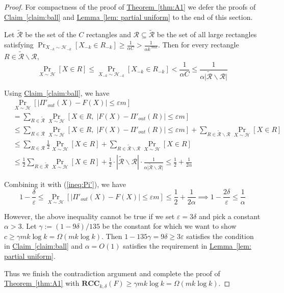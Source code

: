 \documentclass[11pt]{article}
\numberwithin{equation}{section}
\theoremstyle{definition}
\theoremstyle{plain}
\newcommand{\expref}[2]{\hyperref[#2]{#1~\ref{#2}}}
\newcommand{\follows}{\ensuremath{\sim}}
\newcommand{\error}{\ensuremath{\delta}}
\newcommand{\gap}{\ensuremath{\varepsilon}}
\newcommand{\bigo}[1]{\ensuremath{{{O} \left( {#1} \right)}}}
\newcommand{\bigomega}[1]{\ensuremath{{\Omega \left( {#1} \right)}}}
\newcommand{\eqdef}{\ensuremath{:=}}
\newcommand{\rcc}{\ensuremath{\mathbf{RCC}}}
\begin{document}
\begin{proof}
		For compactness of the proof of \expref{Theorem}{thm:A1} we defer the proofs of \expref{Claim}{claim:ball} and \expref{Lemma}{lem: partial uniform}  to the end of this section.

		Let $\widetilde{\mathcal{R}}$ be the set of the $C$ rectangles and $\mathcal{R}\subseteq\widetilde{\mathcal{R}}$ be the set of all large rectangles satisfying $\Pr_{X_{-k} \sim \mathcal{H}_{-k}}[X_{-k}\in R_{-k}]\ge \frac{1}{\alpha C}>\frac{1}{\alpha k^{\gamma mk}}$.
		Then for every rectangle $R\in \widetilde{\mathcal{R}}\backslash\mathcal{R}$, 
		\[\Pr_{X \sim \mathcal{H}}[X\in R]\le  \Pr_{X_{-k} \sim \mathcal{H}_{-k}}[X_{-k}\in R_{-k}]< \frac{1}{\alpha C} \le \frac{1}{\alpha \big|\widetilde{\mathcal{R}}\backslash\mathcal{R}
		\big|} \]

		Using \expref{Claim}{claim:ball}, we have
		\begin{align*}
			&\Pr_{X\follows \mathcal{H}}\left[ \left| \Pi'_{out}(X) - F(X)\right| \le \gap m \right]	\\
			&=  \sum_{R\in \widetilde{\mathcal{R}}} %
			\Pr_{X\follows \mathcal{H}}\left[  X\in R,\; \left|F(X)-\Pi'_{out}(R)\right|\le \gap m \right] \\
			&\le  \sum_{R\in {\mathcal{R}}} %
			\Pr_{X\follows \mathcal{H}}\left[  X\in R,\; \left|F(X)-\Pi'_{out}(R)\right|\le \gap m \right] 
			+ \sum_{R\in \widetilde{\mathcal{R}}\backslash\mathcal{R}} \Pr_{X\follows \mathcal{H}}[X\in R] \\
			&\le \sum_{R\in {\mathcal{R}}}  \frac{1}{2} \Pr_{X\follows \mathcal{H}}\left[ X\in R\right]
			+ \sum_{R\in \widetilde{\mathcal{R}}\backslash\mathcal{R}} \Pr_{X\follows \mathcal{H}}[X\in R] \\
			&\le \frac{1}{2} \sum_{R\in \widetilde{\mathcal{R}}} \Pr_{X\follows \mathcal{H}}[X\in R] +\frac{1}{2} \cdot \left| \widetilde{\mathcal{R}}\backslash\mathcal{R}\right|\cdot \frac{1}{\alpha \big|\widetilde{\mathcal{R}}\backslash\mathcal{R}
		\big|}
			\le \frac{1}{2}+\frac{1}{2\alpha}
		\end{align*}	

Combining it with (\ref{ineq:Pi'}), %
%
%
we have 
	\[1-\frac{\error}{\gap} \le \Pr_{X\follows \mathcal{H}}\left[ \left| \Pi'_{out}(X) - F(X)\right| \le \gap m \right] \le \frac{1}{2}+\frac{1}{2\alpha}  
	\implies 1-\frac{2\error}{\gap}\le \frac{1}{\alpha}\]
	
	However, the above inequality cannot be true if we set $\gap =3\error$ and pick a constant $\alpha>3$.
	Let $\gamma\eqdef (1-9\error)/135$ be the constant for which we want to show $c\ge \gamma mk\log k= \bigomega{m k \log k}$.
	Then $1-135\gamma = 9\error \ge 3\gap$ satisfies the condition in \expref{Claim}{claim:ball} and $\alpha=\bigo{1}$ satisfies the requirement in \expref{Lemma}{lem: partial uniform}.



	Thus we finish the contradiction argument and complete the proof of \expref{Theorem}{thm:A1} with $\rcc_{k,\error}(F)\ge  \gamma mk\log k =\bigomega{m k\log k}$. 
	\end{proof}
\end{document}
